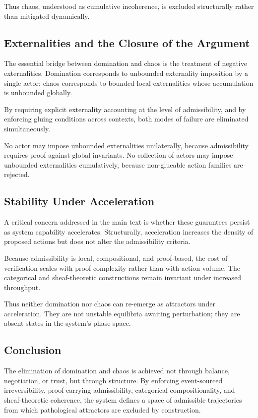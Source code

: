 \documentclass[11pt,oneside]{article}
\begin{document}
Thus chaos, understood as cumulative incoherence, is excluded structurally rather than mitigated dynamically.

\subsection{Externalities and the Closure of the Argument}

The essential bridge between domination and chaos is the treatment of negative externalities. Domination corresponds to unbounded externality imposition by a single actor; chaos corresponds to bounded local externalities whose accumulation is unbounded globally.

By requiring explicit externality accounting at the level of admissibility, and by enforcing gluing conditions across contexts, both modes of failure are eliminated simultaneously.

No actor may impose unbounded externalities unilaterally, because admissibility requires proof against global invariants.  
No collection of actors may impose unbounded externalities cumulatively, because non-glueable action families are rejected.

\subsection{Stability Under Acceleration}

A critical concern addressed in the main text is whether these guarantees persist as system capability accelerates. Structurally, acceleration increases the density of proposed actions but does not alter the admissibility criteria.

Because admissibility is local, compositional, and proof-based, the cost of verification scales with proof complexity rather than with action volume. The categorical and sheaf-theoretic constructions remain invariant under increased throughput.

Thus neither domination nor chaos can re-emerge as attractors under acceleration. They are not unstable equilibria awaiting perturbation; they are absent states in the system’s phase space.

\subsection{Conclusion}

The elimination of domination and chaos is achieved not through balance, negotiation, or trust, but through structure. By enforcing event-sourced irreversibility, proof-carrying admissibility, categorical compositionality, and sheaf-theoretic coherence, the system defines a space of admissible trajectories from which pathological attractors are excluded by construction.
\end{document}
